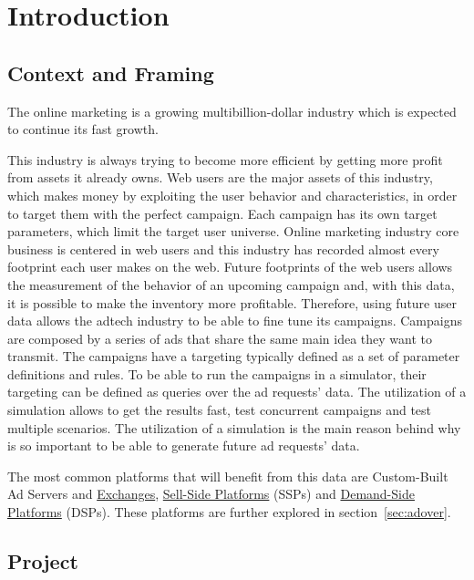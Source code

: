 \chapter{Introduction} \label{chap:intro}


\section{Context and Framing} \label{sec:context}

The online marketing is a growing multibillion-dollar industry \cite{PricewaterhouseCoopers2013}
which is expected to continue its fast growth\cite{PricewaterhouseCoopers2013a}.

This industry is always trying to become more efficient by getting more profit from
assets it already owns. 
Web users are the major assets of this industry, which makes money by exploiting the user behavior and characteristics, in order to target them with the
perfect campaign. Each campaign has its own target parameters, which limit the target user universe.
Online marketing industry core business is centered in web users and this industry has recorded almost every footprint each user makes on the web.
Future footprints of the web users allows the measurement of the behavior of an
upcoming campaign and, with this data, it is possible to make the inventory more
profitable. Therefore, using future user data allows the adtech industry to be able to fine tune its campaigns. 
Campaigns are composed by a series of ads that share the same main idea they
want to transmit. The campaigns have a targeting typically defined as a set of
parameter definitions and rules. To be able to run the campaigns in a
simulator, their targeting can be defined as
queries over the ad requests' data. The utilization of a simulation allows to
get the results fast, test concurrent campaigns and test multiple scenarios.
The utilization of a simulation is the main reason behind
why is so important to be able to generate future ad requests' data.

The most common platforms that will benefit from this data are Custom-Built Ad
Servers and \hyperref[itm:adex]{Exchanges}, \hyperref[itm:ssp]{Sell-Side Platforms} (SSPs) and
\hyperref[itm:dsp]{Demand-Side Platforms}
(DSPs). These platforms are further explored in section~\ref{sec:adover}.


\section{Project} \label{sec:proj}

